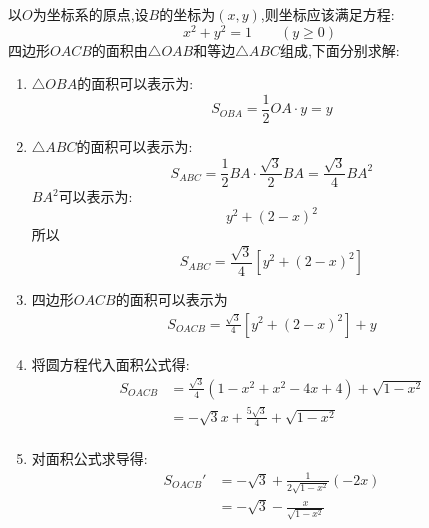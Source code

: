 \begin{questions}
\begin{figure*}[ht]
	\end{figure*}
	\begin{solution}
		以$O$为坐标系的原点,设$B$的坐标为$(x,y)$,则坐标应该满足方程:
		\begin{equation*}
			x^2 + y^2 = 1 \qquad (y \geqslant 0)
		\end{equation*}
		四边形$OACB$的面积由$\triangle{OAB}$和等边$\triangle{ABC}$组成,下面分别求解:
		\begin{enumerate}[label=\zhnum*、]
			\item $\triangle{OBA}$的面积可以表示为:
			      \begin{equation*}
				      S_{OBA} = \frac12 OA \cdot y = y
			      \end{equation*}
			\item $\triangle{ABC}$的面积可以表示为:
			      \begin{equation*}
				      S_{ABC} = \frac12BA\cdot\frac{\sqrt{3}}{2}BA = \frac{\sqrt{3}}{4}BA^2
			      \end{equation*}
			      $BA^2$可以表示为:
			      \begin{equation*}
				      y^2 + (2-x)^2
			      \end{equation*}
			      所以
			      \begin{equation*}
				      S_{ABC} = \frac{\sqrt{3}}{4}[y^2 + (2-x)^2]
			      \end{equation*}
			\item 四边形$OACB$的面积可以表示为
			      \begin{align*}
				      S_{OACB} = \frac{\sqrt{3}}{4}[y^2 + (2-x)^2] + y
			      \end{align*}
			\item 将圆方程代入面积公式得:
			      \begin{align*}
				      S_{OACB} & = \frac{\sqrt{3}}{4}(1-x^2 + x^2 - 4x + 4) + \sqrt{1-x^2} \\
				               & = -\sqrt{3}x + \frac{5\sqrt{3}}{4} + \sqrt{1-x^2}         \\
			      \end{align*}
			\item 对面积公式求导得:
			      \begin{align*}
				      S_{OACB}' & = -\sqrt{3}  + \frac{1}{2\sqrt{1-x^2}}(-2x) \\
				                & =  -\sqrt{3} - \frac{x}{\sqrt{1-x^2}}

\end{align*}
\end{enumerate}
\end{solution}
\end{questions}
